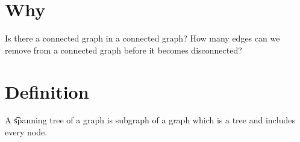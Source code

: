 

\section*{Why}

Is there a  connected graph in a connected graph?
How many edges can we remove from a connected graph before it becomes disconnected?

\section*{Definition}

A \t{spanning tree of a graph} is subgraph of a graph which is a tree and includes every node.
